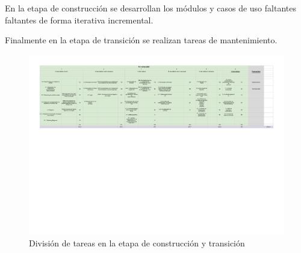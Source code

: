 En la etapa de construcción se desarrollan los módulos y casos de uso faltantes faltantes de forma iterativa incremental. 

Finalmente en la etapa de transición se realizan tareas de mantenimiento.

\newpage
\begin{landscape}

\begin{figure}[h!]
   \includegraphics[scale=0.80]{imagenes/etapas-construccion.pdf}
   \caption{División de tareas en la etapa de construcción y transición}
\end{figure}

\end{landscape}
\newpage



